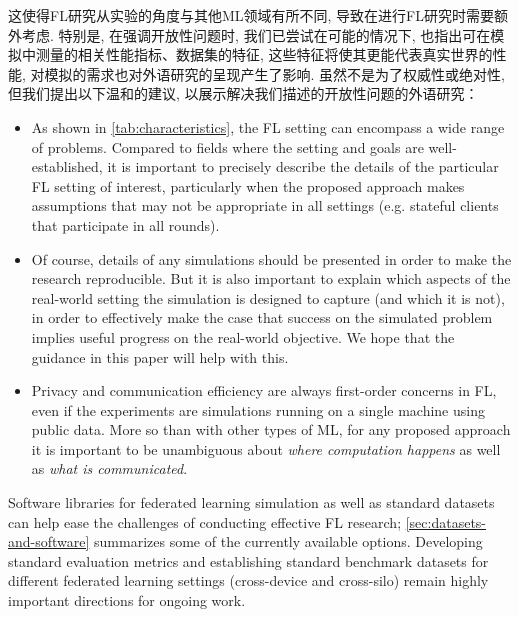 这使得FL研究从实验的角度与其他ML领域有所不同, 导致在进行FL研究时需要额外考虑. 特别是, 在强调开放性问题时, 我们已尝试在可能的情况下, 也指出可在模拟中测量的相关性能指标、数据集的特征, 这些特征将使其更能代表真实世界的性能, 对模拟的需求也对外语研究的呈现产生了影响. 虽然不是为了权威性或绝对性, 但我们提出以下温和的建议, 以展示解决我们描述的开放性问题的外语研究：


\begin{itemize}
    \item As shown in \cref{tab:characteristics}, the FL setting can encompass a wide range of problems. Compared to fields where the setting and goals are well-established, it is important to precisely describe the details of the particular FL setting of interest, particularly when the proposed approach makes assumptions that may not be appropriate in all settings (e.g. stateful clients that participate in all rounds).
    
    \item Of course, details of any simulations should be presented in order to make the research reproducible. But it is also important to explain which aspects of the real-world setting the simulation is designed to capture (and which it is not), in order to effectively make the case that success on the simulated problem implies useful progress on the real-world objective. We hope that the guidance in this paper will help with this.
    
    \item Privacy and communication efficiency are always first-order concerns in FL, even if the experiments are simulations running on a single machine using public data.  More so than with other types of ML, for any proposed approach it is important to be unambiguous about \emph{where computation happens} as well as \emph{what is communicated}.
\end{itemize}

Software libraries for federated learning simulation as well as standard datasets can help ease the challenges of conducting effective FL research; \cref{sec:datasets-and-software} summarizes some of the currently available options. Developing standard evaluation metrics and establishing standard benchmark datasets for different federated learning settings (cross-device and cross-silo) remain highly important directions for ongoing work.

